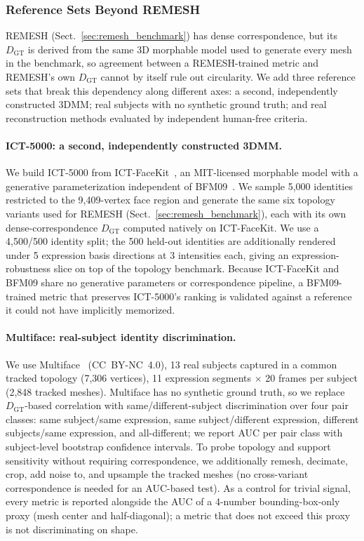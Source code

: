 \subsubsection{Reference Sets Beyond REMESH}
\label{sec:ref_sets}
REMESH (Sect.~\ref{sec:remesh_benchmark}) has dense correspondence, but its $D_{\mathrm{GT}}$ is derived from the same 3D morphable model used to generate every mesh in the benchmark, so agreement between a REMESH-trained metric and REMESH's own $D_{\mathrm{GT}}$ cannot by itself rule out circularity. We add three reference sets that break this dependency along different axes: a second, independently constructed 3DMM; real subjects with no synthetic ground truth; and real reconstruction methods evaluated by independent human-free criteria.

\paragraph{ICT-5000: a second, independently constructed 3DMM.}
We build ICT-5000 from ICT-FaceKit~\cite{ict-facekit}, an MIT-licensed morphable model with a generative parameterization independent of BFM09~\cite{paysan2009bfm}. We sample 5,000 identities restricted to the 9,409-vertex face region and generate the same six topology variants used for REMESH (Sect.~\ref{sec:remesh_benchmark}), each with its own dense-correspondence $D_{\mathrm{GT}}$ computed natively on ICT-FaceKit. We use a 4,500/500 identity split; the 500 held-out identities are additionally rendered under 5 expression basis directions at 3 intensities each, giving an expression-robustness slice on top of the topology benchmark. Because ICT-FaceKit and BFM09 share no generative parameters or correspondence pipeline, a BFM09-trained metric that preserves ICT-5000's ranking is validated against a reference it could not have implicitly memorized.

\paragraph{Multiface: real-subject identity discrimination.}
We use Multiface~\cite{wuu2022multiface} (CC~BY-NC~4.0), 13 real subjects captured in a common tracked topology (7,306 vertices), 11 expression segments $\times$ 20 frames per subject (2,848 tracked meshes). Multiface has no synthetic ground truth, so we replace $D_{\mathrm{GT}}$-based correlation with same/different-subject discrimination over four pair classes: same subject/same expression, same subject/different expression, different subjects/same expression, and all-different; we report AUC per pair class with subject-level bootstrap confidence intervals. To probe topology and support sensitivity without requiring correspondence, we additionally remesh, decimate, crop, add noise to, and upsample the tracked meshes (no cross-variant correspondence is needed for an AUC-based test). As a control for trivial signal, every metric is reported alongside the AUC of a 4-number bounding-box-only proxy (mesh center and half-diagonal); a metric that does not exceed this proxy is not discriminating on shape.

